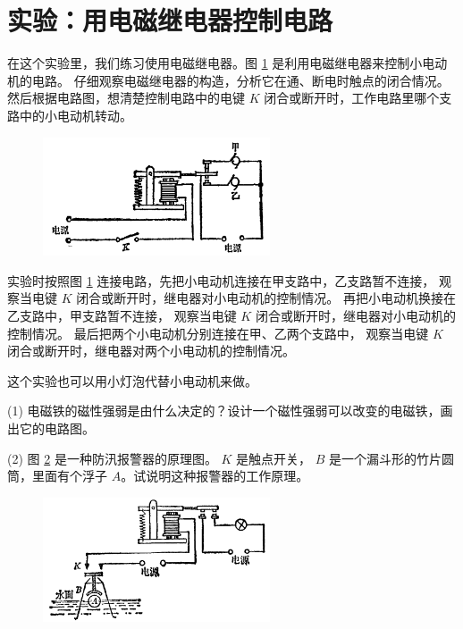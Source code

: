 \section{实验：用电磁继电器控制电路}\label{sec:10-7}

在这个实验里，我们练习使用电磁继电器。图 \ref{fig:10-31} 是利用电磁继电器来控制小电动机的电路。
仔细观察电磁继电器的构造，分析它在通、断电时触点的闭合情况。
然后根据电路图，想清楚控制电路中的电键 $K$ 闭合或断开时，工作电路里哪个支路中的小电动机转动。

\begin{figure}[htbp]
    \centering
    \includegraphics[width=0.6\textwidth]{../pic/czwl2-ch10-31}
    \caption{}\label{fig:10-31}
\end{figure}

实验时按照图 \ref{fig:10-31} 连接电路，先把小电动机连接在甲支路中，乙支路暂不连接，
观察当电键 $K$ 闭合或断开时，继电器对小电动机的控制情况。
再把小电动机换接在乙支路中，甲支路暂不连接，
观察当电键 $K$ 闭合或断开时，继电器对小电动机的控制情况。
最后把两个小电动机分别连接在甲、乙两个支路中，
观察当电键 $K$ 闭合或断开时，继电器对两个小电动机的控制情况。

这个实验也可以用小灯泡代替小电动机来做。



\lianxi

(1) 电磁铁的磁性强弱是由什么决定的？设计一个磁性强弱可以改变的电磁铁，画出它的电路图。


(2) 图 \ref{fig:10-32} 是一种防汛报警器的原理图。 $K$ 是触点开关，
$B$ 是一个漏斗形的竹片圆筒，里面有个浮子 $A$。试说明这种报警器的工作原理。

\begin{figure}[htbp]
    \centering
    \includegraphics[width=0.6\textwidth]{../pic/czwl2-ch10-32}
    \caption{}\label{fig:10-32}
\end{figure}

